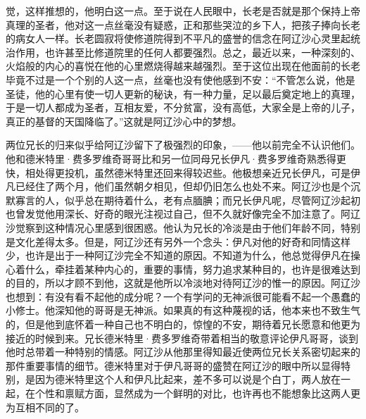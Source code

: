 觉，这样推想的，他明白这一点。至于说在人民眼中，长老是否就是那个保持上帝真理的圣者，他对这一点丝毫没有疑惑，正和那些哭泣的乡下人，把孩子捧向长老的病女人一样。长老圆寂将使修道院得到不平凡的盛誉的信念在阿辽沙心灵里起统治作用，也许甚至比修道院里的任何人都要强烈。总之，最近以来，一种深刻的、火焰般的内心的喜悦在他的心里燃烧得越来越强烈。至于这位出现在他面前的长老毕竟不过是一个个别的人这一点，丝毫也没有使他感到不安：“不管怎么说，他是圣徒，他的心里有使一切人更新的秘诀，有一种力量，足以最后奠定地上的真理，于是一切人都成为圣者，互相友爱，不分贫富，没有高低，大家全是上帝的儿子，真正的基督的天国降临了。”这就是阿辽沙心中的梦想。
\par 两位兄长的归来似乎给阿辽沙留下了极强烈的印象，——他以前完全不认识他们。他和德米特里·费多罗维奇哥哥比和另一位同母兄长伊凡·费多罗维奇熟悉得更快，相处得更投机，虽然德米特里还回来得较迟些。他极想亲近兄长伊凡，可是伊凡已经住了两个月，他们虽然朝夕相见，但却仍旧怎么也处不来。阿辽沙也是个沉默寡言的人，似乎总在期待着什么，老有点腼腆；而兄长伊凡呢，尽管阿辽沙起初也曾发觉他用深长、好奇的眼光注视过自己，但不久就好像完全不加注意了。阿辽沙觉察到这种情况心里感到很困惑。他认为兄长的冷淡是由于他们年龄不同，特别是文化差得太多。但是，阿辽沙还有另外一个念头：伊凡对他的好奇和同情这样少，也许是出于一种阿辽沙完全不知道的原因。不知道为什么，他总觉得伊凡在操心着什么，牵挂着某种内心的，重要的事情，努力追求某种目的，也许是很难达到的目的，所以才顾不到他，这就是他所以冷淡地对待阿辽沙的惟一的原因。阿辽沙也想到：有没有看不起他的成分呢？一个有学问的无神派很可能看不起一个愚蠢的小修士。他深知他的哥哥是无神派。如果真的有这种蔑视的话，他本来也不致生气的，但是他到底怀着一种自己也不明白的，惊惶的不安，期待着兄长愿意和他更为接近的时候到来。兄长德米特里·费多罗维奇带着相当的敬意评论伊凡哥哥，谈到他时总带着一种特别的情感。阿辽沙从他那里得知最近使两位兄长关系密切起来的那件重要事情的细节。德米特里对于伊凡哥哥的盛赞在阿辽沙的眼中所以显得特别，是因为德米特里这个人和伊凡比起来，差不多可以说是个白丁，两人放在一起，在个性和禀赋方面，显然成为一个鲜明的对比，也许再也不能想象比这两人更为互相不同的了。
